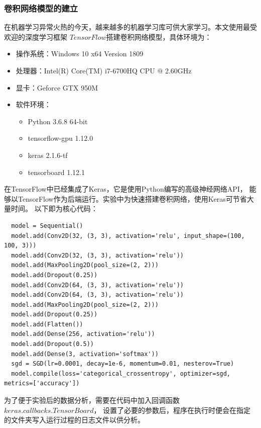   \subsubsection{\hei\sihao\textbf{卷积网络模型的建立}}
    在机器学习异常火热的今天，越来越多的机器学习库可供大家学习。本文使用最受欢迎的深度学习框架
    $TensorFlow$搭建卷积网络模型，具体环境为：

    {\hei\dawu
    \begin{itemize}
      \item 操作系统：Windows 10 x64 Version 1809
      \item 处理器：Intel(R) Core(TM) i7-6700HQ CPU @ 2.60GHz
      \item 显卡：Geforce GTX 950M
      \item 软件环境：
            \begin{itemize}
              \item Python 3.6.8 64-bit
              \item tensorflow-gpu 1.12.0
              \item keras 2.1.6-tf
              \item tensorboard 1.12.1
            \end{itemize}
    \end{itemize}
    }

    在TensorFlow中已经集成了Keras，它是使用Python编写的高级神经网络API，
    能够以TensorFlow作为后端运行。实验中为快速搭建卷积网络，使用Keras可节省大量时间。
    以下即为核心代码：

    \begin{lstlisting}
  model = Sequential()
  model.add(Conv2D(32, (3, 3), activation='relu', input_shape=(100, 100, 3)))
  model.add(Conv2D(32, (3, 3), activation='relu'))
  model.add(MaxPooling2D(pool_size=(2, 2)))
  model.add(Dropout(0.25))
  model.add(Conv2D(64, (3, 3), activation='relu'))
  model.add(Conv2D(64, (3, 3), activation='relu'))
  model.add(MaxPooling2D(pool_size=(2, 2)))
  model.add(Dropout(0.25))
  model.add(Flatten())
  model.add(Dense(256, activation='relu'))
  model.add(Dropout(0.5))
  model.add(Dense(3, activation='softmax'))
  sgd = SGD(lr=0.0001, decay=1e-6, momentum=0.01, nesterov=True)
  model.compile(loss='categorical_crossentropy', optimizer=sgd, metrics=['accuracy'])
    \end{lstlisting}

    为了便于实验后的数据分析，需要在代码中加入回调函数$keras.callbacks.TensorBoard$，
    设置了必要的参数后，程序在执行时便会在指定的文件夹写入运行过程的日志文件以供分析。
